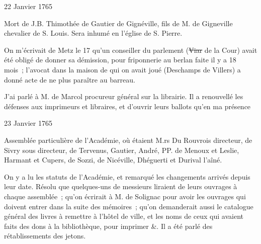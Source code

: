                      \begin{diary}{22 Janvier 1765}{}
                        
                         Mort de J.B. Thimothée de Gautier de
                              Gignéville,
                           fils de M. de
                              Gigneville
                           chevalier de S. Louis. Sera
                           inhumé en l’église de S.
                              Pierre. \bigskip
        
        
                         On m'écrivait de Metz
                           le 17 qu'un conseiller
                           du parlement (\sout{Viar} de la Cour) avait été obligé de donner sa démission, pour friponnerie
                           au berlan faite il y a 18
                           mois ; l'avocat dans
                           la maison de qui on avait joué (Deschamps
                              de Villers) a donné acte de ne plus paraître
                           au barreau. \bigskip
        
        
                         J'ai parlé à M. de Marcol
                           procureur général sur la
                           librairie. Il a renouvellé les défenses aux
                           imprimeurs et libraires, et d'ouvrir leurs
                           ballots qu'en ma
                           présence \bigskip
        
        
                     \end{diary}

                     \begin{diary}{23 Janvier 1765}{}
                        
                        
                           Assemblée particulière de l'Académie, où
                           étaient
                           M.rs Du Rouvrois directeur,
                              de Sivry
                           sous directeur,
                           de Tervenus, Gautier, André, PP. de Menoux et
                              Leslie,
                           Harmant et Cupers, de
                              Sozzi, de Nicéville,
                              Dhéguerti
                           et Durival l'aîné. \bigskip
        
        
                         On y a lu les statuts de l'Académie, et remarqué
                           les changements arrivés depuis leur date. Résolu
                           que quelques-uns de messieurs liraient de leurs ouvrages
                           à chaque assemblée ; qu'on écrirait à M. de Solignac
                           pour avoir les ouvrages qui doivent entrer dans
                           la suite des mémoires ; qu'on demanderait aussi le
                           catalogue général des livres à remettre à l'hôtel
                              de ville, et les noms de ceux qui avaient faits
                           des dons à la bibliothèque, pour imprimer &.
                           Il a été parlé des rétablissements des jetons.
                        \bigskip
        
        
                     \end{diary}

